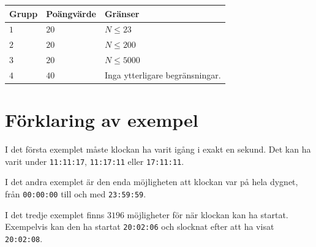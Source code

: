 \noindent
\begin{tabular}{| l | l | l |}
  \hline
  \textbf{Grupp} & \textbf{Poängvärde} & \textbf{Gränser} \\ \hline
  $1$    & $20$        &  $ N \leq 23 $ \\ \hline 
  $2$    & $20$        &  $ N \leq 200 $ \\ \hline
  $3$    & $20$        &  $ N \leq 5000 $ \\ \hline
  $4$    & $40$        &  Inga ytterligare begränsningar. \\ \hline
\end{tabular}


\section*{Förklaring av exempel}
I det första exemplet måste klockan ha varit igång i exakt en sekund. Det kan ha varit under \texttt{11:11:17}, \texttt{11:17:11} eller \texttt{17:11:11}.

I det andra exemplet är den enda möjligheten att klockan var på hela dygnet, från \texttt{00:00:00} till och med \texttt{23:59:59}.

I det tredje exemplet finns $3196$ möjligheter för när klockan kan ha startat. Exempelvis kan den ha startat \texttt{20:02:06} och slocknat efter att ha visat \texttt{20:02:08}.
